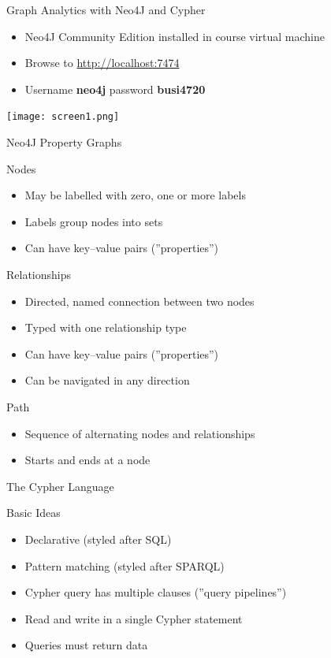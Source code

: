 \documentclass[ignorenonframetext,xcolor=x11names]{beamer}
\begin{document}
\begin{frame}{Graph Analytics with Neo4J and Cypher}
\begin{itemize}
  \item Neo4J Community Edition installed in course virtual machine
  \item Browse to \url{http://localhost:7474}
  \item Username \textbf{neo4j} password \textbf{busi4720}
\end{itemize}
\centering
\texttt{[image: screen1.png]}
\end{frame}


\begin{frame}{Neo4J Property Graphs}

\begin{block}{Nodes}
\begin{itemize}
  \item May be labelled with zero, one or more labels
  \item Labels group nodes into sets
  \item Can have key--value pairs (''properties'')
\end{itemize}
\end{block}

\begin{block}{Relationships}
\begin{itemize}
  \item Directed, named connection between two nodes
  \item Typed with one relationship type
  \item Can have key--value pairs (''properties'')
  \item Can be navigated in any direction
\end{itemize}
\end{block}

\begin{block}{Path}
\begin{itemize}
  \item Sequence of alternating nodes and relationships
  \item Starts and ends at a node
\end{itemize}
\end{block}
\end{frame}

\begin{frame}{The Cypher Language}

\begin{block}{Basic Ideas}
\begin{itemize}
  \item Declarative (styled after SQL)
  \item Pattern matching (styled after SPARQL)
  \item Cypher query has multiple clauses (''query pipelines'')
  \item Read and write in a single Cypher statement
  \item Queries must return data
\end{itemize}
\end{block}
\end{frame}
\end{document}
